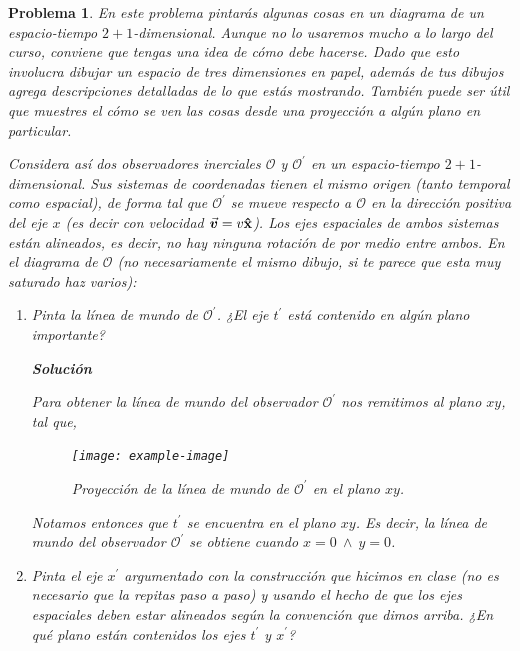 \documentclass[12pt]{article}
\theoremstyle{break}
\newtheorem{exercise}{Problema}
\theoremstyle{nonumberbreak}
\DeclareRobustCommand{\uvec}[1]{{%
  \ifcsname uvec#1\endcsname
     \csname uvec#1\endcsname
   \else
    \bm{\hat{\mathbf{#1}}}%
   \fi
}}%
\newcommand*{\observer}{\mathcal{O}}
\newcommand*{\primeobserver}{\mathcal{O}^{\prime}}
\newcommand*{\inlinesol}{\vspace*{10pt}\textbf{Solución}\vspace*{10pt}}
\begin{document}
    \pagebreak
    \begin{exercise}
        En este problema pintarás algunas cosas en un diagrama de un espacio-tiempo \(2 + 1\)-dimensional. Aunque no lo usaremos mucho a lo largo del curso, conviene que tengas una idea de cómo debe hacerse. Dado que esto involucra dibujar un espacio de tres dimensiones en papel, además de tus dibujos agrega descripciones detalladas de lo que estás mostrando. También puede ser útil que muestres el cómo se ven las cosas desde una proyección a algún plano en particular.

        Considera así dos observadores inerciales \(\observer\) y \(\primeobserver\) en un espacio-tiempo \(2 + 1\)-dimensional. Sus sistemas de coordenadas tienen el mismo origen (tanto temporal como espacial), de forma tal que \(\primeobserver\) se mueve respecto a \(\observer\) en la dirección positiva del eje \(x\) (es decir con velocidad \(\va*{v} = v\uvec{x}\)). Los ejes espaciales de ambos sistemas están alineados, es decir, no hay ninguna rotación de por medio entre ambos. En el diagrama de \(\observer\) (no necesariamente el mismo dibujo, si te parece que esta muy saturado haz varios):

        \begin{enumerate}[label = \alph*)]
            \item Pinta la línea de mundo de \(\primeobserver\). ¿El eje \(t^{\prime}\) está contenido en algún plano importante?
            
            \inlinesol

            Para obtener la línea de mundo del observador \(\primeobserver\) nos remitimos al plano \(xy\), tal que,

            \begin{figure}[htb]
                \centering
                \texttt{[image: example-image]}
                \caption{Proyección de la línea de mundo de \(\primeobserver\) en el plano \(xy\).}
                \label{eq:Oprime-Planexy}
            \end{figure}

            Notamos entonces que \(t^{\prime}\) se encuentra en el plano \(xy\). Es decir, la línea de mundo del observador \(\primeobserver\) se obtiene cuando \(x = 0\ \wedge\ y = 0\). 

            \item Pinta el eje \(x^{\prime}\) argumentado con la construcción que hicimos en clase (no es necesario que la repitas paso a paso) y usando el hecho de que los ejes espaciales deben estar alineados según la convención que dimos arriba. ¿En qué plano están contenidos los ejes \(t^{\prime}\) y \(x^{\prime}\)?
            

\end{enumerate}
\end{exercise}
\end{document}
